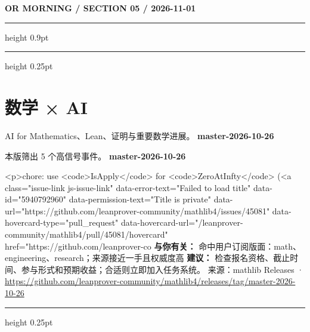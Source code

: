 \documentclass[10.5pt]{ctexart}
\begin{document}
\newpage
{\small\bfseries OR MORNING / SECTION 05 / 2026-11-01}
\vspace{2mm}
\hrule height 0.9pt
\vspace{1.5mm}
\hrule height 0.25pt
\vspace{4mm}
\section*{数学 × AI}
{\color{ormuted} AI for Mathematics、Lean、证明与重要数学进展。}
\vspace{2mm}
{\LARGE\bfseries master-2026-10-26}\par
\vspace{1mm}
{\color{ormuted} 本版筛出 5 个高信号事件。}
\vspace{3mm}
{\Large\bfseries master-2026-10-26}\par
<p>chore: use <code>IsApply</code> for <code>ZeroAtInfty</code> (<a class="issue-link js-issue-link" data-error-text="Failed to load title" data-id="5940792960" data-permission-text="Title is private" data-url="https://github.com/leanprover-community/mathlib4/issues/45081" data-hovercard-type="pull\_request" data-hovercard-url="/leanprover-community/mathlib4/pull/45081/hovercard" href="https://github.com/leanprover-co
\textbf{与你有关：} 命中用户订阅版面：math、engineering、research；来源接近一手且权威度高
\textbf{建议：} 检查报名资格、截止时间、参与形式和预期收益；合适则立即加入任务系统。
{\footnotesize\color{ormuted} 来源：mathlib Releases · \url{https://github.com/leanprover-community/mathlib4/releases/tag/master-2026-10-26}}
\vspace{4mm}
\hrule height 0.25pt
\vspace{3mm}
\end{document}
